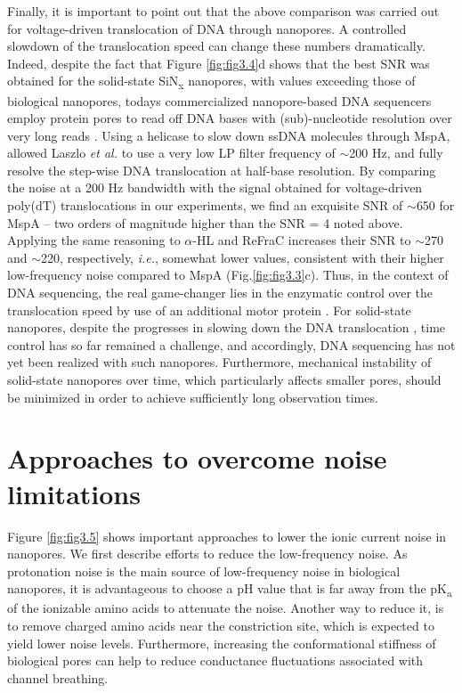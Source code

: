Finally, it is important to point out that the above comparison was carried out for voltage-driven translocation of DNA through nanopores. A controlled slowdown of the translocation speed can change these numbers dramatically. Indeed, despite the fact that Figure \ref{fig:fig3.4}d shows that the best SNR was obtained for the solid-state SiN\textsubscript{x} nanopores, with values exceeding those of biological nanopores, todays commercialized nanopore-based DNA sequencers employ protein pores to read off DNA bases with (sub)-nucleotide resolution over very long reads \cite{Carter2018,Jain2018}. Using a helicase to slow down ssDNA molecules through MspA, allowed Laszlo \emph{et al.} \cite{Laszlo2016} to use a very low LP filter frequency of $\sim$200 Hz, and fully resolve the step-wise DNA translocation at half-base resolution. By comparing the noise at a 200 Hz bandwidth with the signal obtained for voltage-driven poly(dT) translocations in our experiments, we find an exquisite SNR of $\sim$650 for MspA – two orders of magnitude higher than the SNR = 4 noted above. Applying the same reasoning to $\alpha$-HL and ReFraC increases their SNR to $\sim$270 and $\sim$220, respectively, \emph{i.e.}, somewhat lower values, consistent with their higher low-frequency noise compared to MspA (Fig.\ref{fig:fig3.3}c). Thus, in the context of DNA sequencing, the real game-changer lies in the enzymatic control over the translocation speed by use of an additional motor protein \cite{Manrao2012,Carter2018,Laszlo2016,Manrao2010,Jain2016}. For solid-state nanopores, despite the progresses in slowing down the DNA translocation \cite{Feng2015,Keyser2011,Wanunu2007,Pud2016,Gilboa2015,Yamazaki2018}, time control has so far remained a challenge, and accordingly, DNA sequencing has not yet been realized with such nanopores. Furthermore, mechanical instability of solid-state nanopores over time, which particularly affects smaller pores, should be minimized in order to achieve sufficiently long observation times.


\section{Approaches to overcome noise limitations}


Figure \ref{fig:fig3.5} shows important approaches to lower the ionic current noise in nanopores. We first describe efforts to reduce the low-frequency noise. As protonation noise is the main source of low-frequency noise in biological nanopores, it is advantageous to choose a pH value that is far away from the pK\textsubscript{a} of the ionizable amino acids to attenuate the noise. Another way to reduce it, is to remove charged amino acids near the constriction site, which is expected to yield lower noise levels. Furthermore, increasing the conformational stiffness of biological pores can help to reduce conductance fluctuations associated with channel breathing. 


